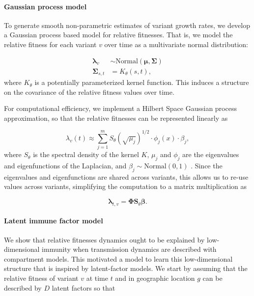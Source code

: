 \documentclass[12pt,oneside,letterpaper]{article}
\renewcommand{\vec}[1]{\boldsymbol{#1}}
\begin{document}
\paragraph{Gaussian process model}%

To generate smooth non-parametric estimates of variant growth rates, we develop a Gaussian process based model for relative fitnesses. 
That is, we model the relative fitness for each variant $v$ over time as a multivariate normal distribution:

\begin{align*}
    \vec{\lambda}_{v} &\sim \text{Normal}(\vec{\mu}, \vec{\Sigma})\\
    \vec{\Sigma}_{s, t} &= K_{\theta}(s, t),
\end{align*}
where $K_{\theta}$ is a potentially parameterized kernel function. 
This induces a structure on the covariance of the relative fitness values over time.

For computational efficiency, we implement a Hilbert Space Gaussian process approximation, so that the relative fitnesses can be represented linearly as

\begin{equation}
    \lambda_{v}(t) \approx \sum_{j=1}^{m} S_{\theta}(\sqrt{\mu_{j}})^{1/2} \cdot \phi_{j}(x) \cdot \beta_{j},
\end{equation}
where $S_{\theta}$ is the spectral density of the kernel $K$, $\mu_{j}$ and $\phi_{j}$ are the eigenvalues and eigenfunctions of the Laplacian, and $\beta_{j} \sim \text{Normal}(0,1)$ \cite{riutortmayol2022practical}.
Since the eigenvalues and eigenfunctions are shared across variants, this allows us to re-use values across variants, simplifying the computation to a matrix multiplication as

\begin{equation*}
    \vec{\lambda}_{t,v} = \vec{\Phi}\vec{S}_{\theta}\vec{\beta}.
\end{equation*}


\paragraph{Latent immune factor model}%

We show that relative fitnesses dynamics ought to be explained by low-dimensional immunity when transmission dynamics are described with compartment models.
This motivated a model to learn this low-dimensional structure that is inspired by latent-factor models. We start by assuming that the relative fitness of variant $v$ at time $t$ and in geographic location $g$ can be described by $D$ latent factors so that
\end{document}
